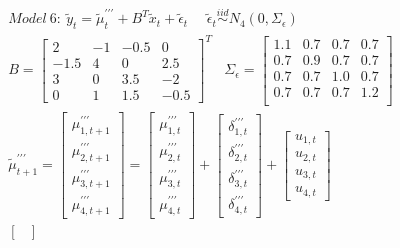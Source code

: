 \documentclass[twoside,11pt]{article}
\begin{document}
\begin{equation} \label{eq:model6}
\begin{gathered}
Model\ 6:\ \tilde{y}_t=\tilde{\mu}_t^{\prime\prime\prime}+B^T\tilde{x}_t+\tilde{\epsilon}_t\ \ \ \ \ \ \tilde{\epsilon}_t\stackrel{iid}\sim N_4(0,\Sigma_\epsilon)\\
B=\begin{bmatrix}
2 & -1 & -0.5 & 0 \\
-1.5 & 4 & 0 & 2.5 \\
3 & 0 & 3.5 & -2 \\
0 & 1 & 1.5 & -0.5 
\end{bmatrix}^T \ \ \ \ \Sigma_\epsilon=\begin{bmatrix}
1.1 & 0.7 & 0.7 & 0.7\\
0.7 & 0.9 & 0.7 & 0.7\\
0.7 & 0.7 & 1.0 & 0.7\\
0.7 & 0.7 & 0.7 & 1.2 \\
\end{bmatrix}\\
\tilde{\mu}^{\prime\prime\prime}_{t+1}=\begin{bmatrix}
\mu_{1,t+1}^{\prime\prime\prime}  \\
\mu_{2,t+1}^{\prime\prime\prime} \\
\mu_{3,t+1}^{\prime\prime\prime} \\
\mu_{4,t+1}^{\prime\prime\prime}
\end{bmatrix}=\begin{bmatrix}
\mu_{1,t}^{\prime\prime\prime} \\
\mu_{2,t}^{\prime\prime\prime} \\
\mu_{3,t}^{\prime\prime\prime} \\
\mu_{4,t}^{\prime\prime\prime}
\end{bmatrix}+\begin{bmatrix}
\delta_{1,t}^{\prime\prime\prime}  \\
\delta_{2,t}^{\prime\prime\prime} \\
\delta_{3,t}^{\prime\prime\prime} \\
\delta_{4,t}^{\prime\prime\prime}
\end{bmatrix}+\begin{bmatrix}
u_{1,t}  \\
u_{2,t} \\
u_{3,t} \\
u_{4,t}
\end{bmatrix} \\
\begin{bmatrix}

\end{bmatrix}
\end{gathered}
\end{equation}
\end{document}
